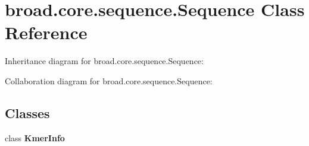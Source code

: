 \hypertarget{classbroad_1_1core_1_1sequence_1_1_sequence}{\section{broad.\+core.\+sequence.\+Sequence Class Reference}
\label{classbroad_1_1core_1_1sequence_1_1_sequence}
}


Inheritance diagram for broad.\+core.\+sequence.\+Sequence\+:


Collaboration diagram for broad.\+core.\+sequence.\+Sequence\+:
\subsection*{Classes}
\begin{DoxyCompactItemize}
\item 
class {\bfseries Kmer\+Info}
\end{DoxyCompactItemize}
